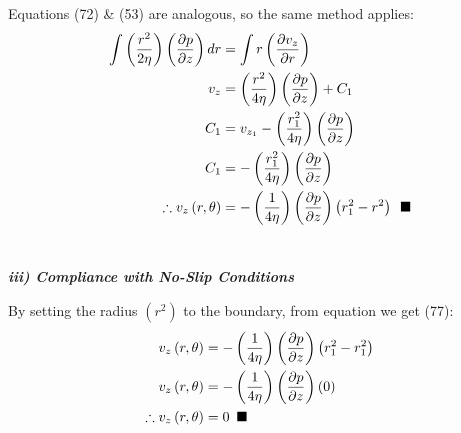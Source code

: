 \documentclass[titlepage]{article}
\begin{document}
    \newpage

    \noindent Equations (72) \& (53) are analogous, so the same method applies:
    \begingroup
        \addtolength\jot{6pt}
        \begin{align}
            \int{\left(\displaystyle\frac{r^2}{2\eta}\right)\left(\frac{\partial{p}}{\partial{z}}\right)dr}&=\int{r\left(\displaystyle\frac{\partial{v_{z}}}{\partial{r}}\right)}\\
            v_{z} &= \left(\displaystyle\frac{r^2}{4\eta}\right)\left(\displaystyle\frac{\partial{p}}{\partial{z}}\right)+C_{1}\\
            C_{1} &= v_{z_{1}} - \left(\displaystyle\frac{r_{1}^2}{4\eta}\right)\left(\displaystyle\frac{\partial{p}}{\partial{z}}\right) \\
            C_{1} &= - \left(\displaystyle\frac{r_{1}^2}{4\eta}\right)\left(\displaystyle\frac{\partial{p}}{\partial{z}}\right) \\
            \therefore v_{z}\left(r,\theta\right) &= -\left(\displaystyle\frac{1}{4\eta}\right)\left(\displaystyle\frac{\partial{p}}{\partial{z}}\right)\left(r_{1}^2-r^2\right)\hspace*{5pt}\blacksquare
        \end{align}
    \endgroup \\

    \begin{center}
        \textbf{\emph{iii) Compliance with No-Slip Conditions}}
    \end{center}

    \noindent By setting the radius $\left(r^2\right)$ to the boundary, from equation we get (77):
    \begin{align}
        v_{z}\left(r,\theta\right) &= -\left(\displaystyle\frac{1}{4\eta}\right)\left(\displaystyle\frac{\partial{p}}{\partial{z}}\right)\left(r_{1}^2-r_{1}^2\right)\\
        v_{z}\left(r,\theta\right) &= -\left(\displaystyle\frac{1}{4\eta}\right)\left(\displaystyle\frac{\partial{p}}{\partial{z}}\right)\left(0\right)\\
        \therefore v_{z}\left(r,\theta\right) &= 0 \hspace*{5pt}\blacksquare
    \end{align} 
\end{document}
